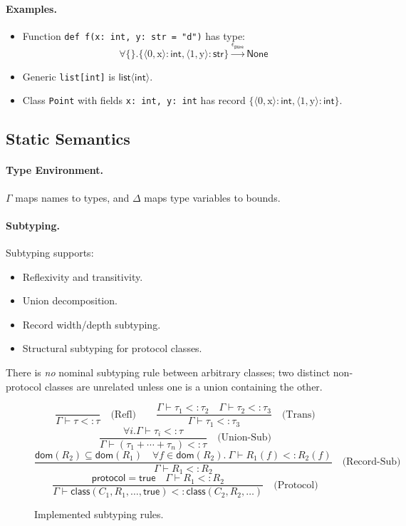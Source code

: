 \paragraph{Examples.}  
\begin{itemize}
\item Function \texttt{def f(x: int, y: str = "d")} has type:
 \[\forall \{\}.\{\langle 0, \text{x} \rangle : \mathsf{int}, \langle 1, \text{y} \rangle : \mathsf{str}\} \xrightarrow{\epsilon_\mathsf{pure}} \mathsf{None}\]
\item Generic \texttt{list[int]} is $\mathsf{list}\langle\mathsf{int}\rangle$.
\item Class \texttt{Point} with fields \texttt{x: int, y: int} has record $\{\langle 0, \text{x} \rangle : \mathsf{int}, \langle 1, \text{y} \rangle : \mathsf{int}\}$.
\end{itemize}

\subsection{Static Semantics}

\paragraph{Type Environment.}  
$\Gamma$ maps names to types, and $\Delta$ maps type variables to bounds.

\paragraph{Subtyping.}  
Subtyping supports:
\begin{itemize}
\item Reflexivity and transitivity.
\item Union decomposition.
\item Record width/depth subtyping.
\item Structural subtyping for protocol classes.
\end{itemize}
There is \emph{no} nominal subtyping rule between arbitrary classes; two distinct non‐protocol classes are unrelated unless one is a union containing the other.

\begin{figure*}[t]
\centering
\[
\frac{}{\Gamma \vdash \tau <: \tau} \quad \text{(Refl)}
\qquad
\frac{\Gamma \vdash \tau_1 <: \tau_2 \quad \Gamma \vdash \tau_2 <: \tau_3}{\Gamma \vdash \tau_1 <: \tau_3} \quad \text{(Trans)}
\]
\[
\frac{\forall i. \Gamma \vdash \tau_i <: \tau}{\Gamma \vdash (\tau_1 + \cdots + \tau_n) <: \tau} \quad \text{(Union-Sub)}
\]
\[
\frac{\mathsf{dom}(R_2) \subseteq \mathsf{dom}(R_1) \quad \forall f \in \mathsf{dom}(R_2).\ \Gamma \vdash R_1(f) <: R_2(f)}{\Gamma \vdash R_1 <: R_2} \quad \text{(Record-Sub)}
\]
\[
\frac{\mathsf{protocol} = \mathsf{true} \quad \Gamma \vdash R_1 <: R_2}{\Gamma \vdash \mathsf{class}(C_1, R_1, \ldots, \mathsf{true}) <: \mathsf{class}(C_2, R_2, \ldots)} \quad \text{(Protocol)}
\]
\caption{Implemented subtyping rules.}
\label{fig:subtyping}
\end{figure*}

